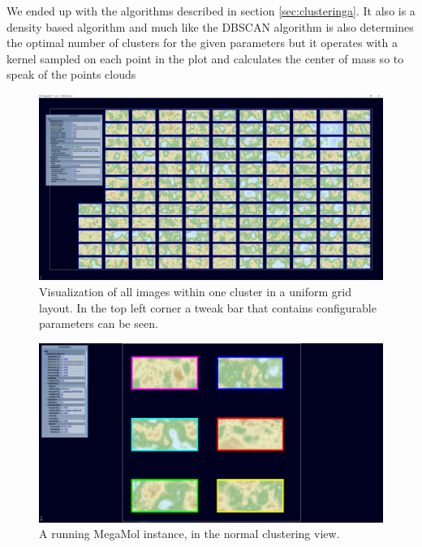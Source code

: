 \documentclass[journal]{vgtc}       %
\begin{document}
We ended up with the algorithms described in section \ref{sec:clusteringa}. It also is a density based algorithm and much like the DBSCAN algorithm is also determines the optimal number of clusters for the given parameters but it operates with a kernel sampled on each point in the plot and calculates the center of mass so to speak of the points clouds








\begin{figure}[t]
	\begin{center}
		\includegraphics[width= \linewidth]{gridLayout.png}
	\end{center}
	\caption{\label{fig:grid} Visualization of all images within one cluster in a uniform grid layout. In the top left corner a tweak bar that contains configurable parameters can be seen.}
\end{figure}
\begin{figure}[t]
	\begin{center}
		\includegraphics[width= \linewidth]{MegaMolExample.png}
	\end{center}
	\caption{\label{fig:mmex} A running MegaMol instance, in the normal clustering view. }
\end{figure}
\end{document}
